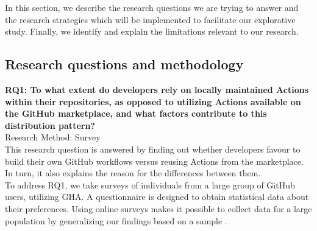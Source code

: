 \documentclass[conference]{IEEEtran}
\begin{document}
    In this section, we describe the research questions we are trying to answer and the research strategies which will be implemented to facilitate our explorative study. Finally, we identify and explain the limitations relevant to our research.

    \subsection{Research questions and methodology}
        \textbf{RQ1: To what extent do developers rely on locally maintained Actions within their repositories, as opposed to utilizing Actions available on the GitHub marketplace, and what factors contribute to this distribution pattern?}\\

        Research Method: Survey\\
            
        This research question is answered by finding out whether developers favour to build their own GitHub workflows versus reusing Actions from the marketplace. In turn, it also explains the reason for the differences between them.\\

        To address RQ1, we take surveys of individuals from a large group of GitHub users, utilizing GHA. A questionnaire is designed to obtain statistical data about their preferences. Using online surveys makes it possible to collect data for a large population by generalizing our findings based on a sample \cite{linaker2013guidelines}.\\
\end{document}
